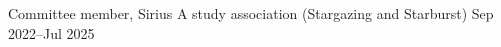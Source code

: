 

\begin{cventries}

  \cventry
  {Committee member, Sirius A study association (Stargazing and Starburst)}
  {} %
  {} %
  {Sep 2022--Jul 2025} %
  {}




\end{cventries}
